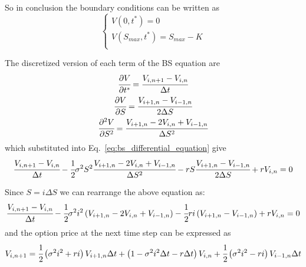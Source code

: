So in conclusion the boundary conditions can be written as
\begin{equation}
\begin{cases}
V(0, t^*) = 0 \\
V(S_{max}, t^*) = S_{max} - K \\
\end{cases}
\end{equation}

The discretized version of each term of the BS equation are
\begin{gather}
\cfrac{\partial V}{\partial t^*} = \cfrac{V_{i, n+1}-V_{i, n}}{\Delta t} \\
\cfrac{\partial V}{\partial S} = \cfrac{V_{i+1, n}-V_{i-1, n}}{2\Delta S} \\
\cfrac{\partial^2 V}{\partial S^2} = \cfrac{V_{i+1, n}-2V_{i, n}+V_{i-1, n}}{\Delta S^2}
\end{gather}
\noindent
which substituted into Eq.~\ref{eq:bs_differential_equation} give
\begin{equation}
\cfrac{V_{i, n+1}-V_{i, n}}{\Delta t} - \cfrac{1}{2}\sigma^2 S^2
\cfrac{V_{i+1, n}-2V_{i, n}+V_{i-1, n}}{\Delta S^2} - rS
\cfrac{V_{i+1,n}-V_{i-1,n}}{2\Delta S} + rV_{i,n} = 0
\end{equation}

Since $S=i\Delta S$ we can rearrange the above equation as:
\begin{equation}
\cfrac{V_{i, n+1}-V_{i, n}}{\Delta t} - \cfrac{1}{2}\sigma^2 i^2
\left(V_{i+1, n}-2V_{i, n}+V_{i-1, n}\right) - \cfrac{1}{2}ri
\left(V_{i+1,n}-V_{i-1,n}\right) + rV_{i,n} = 0
\end{equation}
\noindent
and the option price at the next time step can be expressed as
\begin{equation}
V_{i, n+1} = \cfrac{1}{2}\left(\sigma^2 i^2+ri\right)V_{i+1,n} \Delta t +
\left(1-\sigma^2 i^2\Delta t-r\Delta t \right)V_{i,n} +
\cfrac{1}{2}\left(\sigma^2 i^2 - ri\right)V_{i-1,n} \Delta t
\end{equation}

